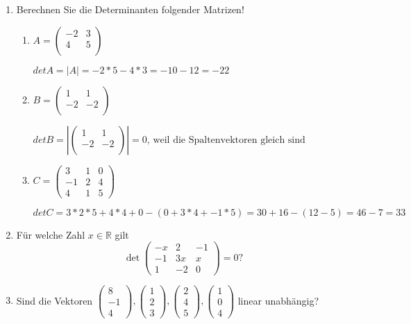 \documentclass[12pt,a4paper]{scrreprt}
\newcommand{\R}{\mathds{R}}
\begin{document}
\begin{enumerate}
\item Berechnen Sie die Determinanten folgender Matrizen!
	\begin{enumerate}
		\item $A=\begin{pmatrix}
			-2 & 3 \\
			4 & 5\\
		\end{pmatrix}$

$det A=|A|=-2*5-4*3=-10-12 = -22$

		\item $B=\begin{pmatrix}
			1 & 1 \\
			-2 & -2\\
		\end{pmatrix}$

$det B	=	|\begin{pmatrix}
			1 & 1 \\
			-2 & -2\\
		\end{pmatrix}|
	= 0 \text{, weil die Spaltenvektoren gleich sind}$

		\item $C=\begin{pmatrix}
			3 	& 1 	& 0 \\
			-1 	& 2 	& 4 \\
			4 	& 1 	& 5
		\end{pmatrix}$

$
det C	= 3*2*5 + 4*4 + 0 - ( 0 + 3*4 + -1*5) = 30+16-(12-5) = 46-7=33
$

	\end{enumerate}
	\item Für welche Zahl $x \in \R$ gilt
	\[
		\det \begin{pmatrix}
			-x & 2 & -1 \\
			-1 & 3x & x \\
			1 & -2 & 0
		\end{pmatrix} =0?
	\]

	\item Sind die Vektoren $\begin{pmatrix}
		8 \\ -1 \\ 4
	\end{pmatrix}, \begin{pmatrix}
		1 \\ 2 \\ 3
	\end{pmatrix}, \begin{pmatrix}
		2 \\ 4 \\ 5
	\end{pmatrix}, \begin{pmatrix}
		1 \\ 0 \\ 4
	\end{pmatrix}$
	linear unabhängig?


\end{enumerate}
\end{document}
